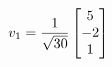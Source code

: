 \documentclass[preview]{standalone}
\begin{document}
\begin{align*}
\special{dvisvgm:raw <g id='unique000'>}v_{1} = \frac{1}{\sqrt{30}} \begin{bmatrix} 5 \\ -2 \\ 1 \end{bmatrix}\special{dvisvgm:raw </g>}
\end{align*}
\end{document}
